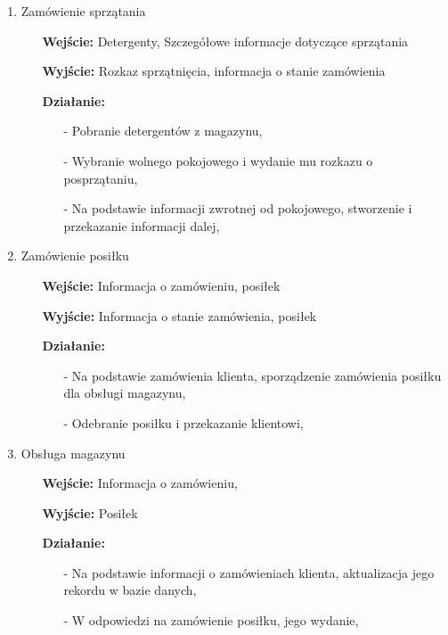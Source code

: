 \documentclass[a4paper, 11pt]{article}
\begin{document}
\begin{enumerate}[label*=\arabic*.]
\begin{enumerate}[label*=\arabic*.]
\begin{enumerate}[label*=\arabic*.]
				\item Zamówienie sprzątania
				\begin{itemize}
					\item [\textbf{Wejście:}] Detergenty, Szczegółowe informacje dotyczące sprzątania
					\item [\textbf{Wyjście:}] Rozkaz sprzątnięcia, informacja o stanie zamówienia
					\item [\textbf{Działanie:}] 
					\begin{itemize}
						\item[-] Pobranie detergentów z magazynu,
						\item[-] Wybranie wolnego pokojowego i wydanie mu rozkazu o posprzątaniu,
						\item[-] Na podstawie informacji zwrotnej od pokojowego, stworzenie i przekazanie informacji dalej,
					\end{itemize}
				\end{itemize}
				\item Zamówienie posiłku
				\begin{itemize}
					\item [\textbf{Wejście:}] Informacja o zamówieniu, posiłek
					\item [\textbf{Wyjście:}] Informacja o stanie zamówienia, posiłek
					\item [\textbf{Działanie:}] 
					\begin{itemize}
						\item[-] Na podstawie zamówienia klienta, sporządzenie zamówienia posiłku dla obsługi magazynu,
						\item[-] Odebranie posiłku i przekazanie klientowi,
					\end{itemize}
				\end{itemize}
				\item Obsługa magazynu
				\begin{itemize}
					\item [\textbf{Wejście:}] Informacja o zamówieniu,
					\item [\textbf{Wyjście:}] Posiłek
					\item [\textbf{Działanie:}] 
					\begin{itemize}
						\item[-] Na podstawie informacji o zamówieniach klienta, aktualizacja jego rekordu w bazie danych,
						\item[-] W odpowiedzi na zamówienie posiłku, jego wydanie,
					\end{itemize}
				\end{itemize}

\end{enumerate}
\end{enumerate}
\end{enumerate}
\end{document}
